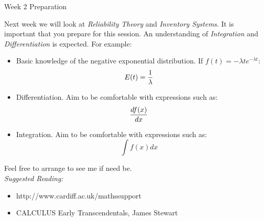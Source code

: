 \documentclass[12pt]{article}
\begin{document}
\begin{center}
\Huge{Week 2 Preparation}
\end{center}
Next week we will look at \emph{Reliability Theory} and \emph{Inventory Systems}. It is important that you prepare for this session. An understanding of \emph{Integration} and \emph{Differentiation} is expected. For example:

\begin{itemize}
\item Basic knowledge of the negative exponential distribution. If $f(t)=-\lambda t e^{- \lambda t}$:
$$E(t)={1\over \lambda}$$
\item Differentiation. Aim to be comfortable with expressions such as:
$${df(x)\over dx}$$
\item Integration. Aim to be comfortable with expressions such as:
$$\int{f(x)}dx$$
\end{itemize}

Feel free to arrange to see me if need be.\\

\emph{Suggested Reading:}
\begin{itemize}
\item http://www.cardiff.ac.uk/mathssupport
\item CALCULUS Early Transcendentals, James Stewart
\end{itemize}
\end{document}
